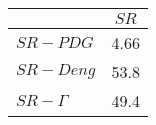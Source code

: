 \begin{tabular}{l|c}
\toprule
{} &  $SR$ \\
\midrule
\textbf{$SR-PDG$   } &  4.66 \\
\textbf{$SR-Deng$  } &  53.8 \\
\textbf{$SR-\Gamma$} &  49.4 \\
\bottomrule
\end{tabular}
